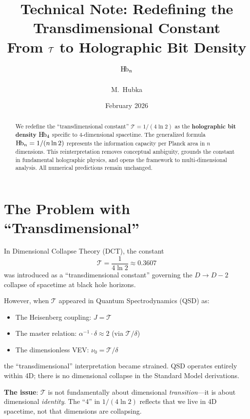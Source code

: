 \documentclass[11pt,a4paper]{article}
\title{\textbf{Technical Note: Redefining the Transdimensional Constant}\\[0.5em]
\Large From $\Tc$ to Holographic Bit Density $\Hb_n$}
\author{M.\ Hubka}
\date{February 2026}
\newcommand{\Hb}{\textnormal{H\kern-0.12em b}}
\newcommand{\Hbn}{\Hb_n}
\newcommand{\Hbfour}{\Hb_4}
\newcommand{\Tc}{\mathcal{T}}
\newcommand{\dgeo}{\delta}
\begin{document}
\maketitle

\begin{abstract}
We redefine the ``transdimensional constant'' $\Tc = 1/(4\ln 2)$ as the \textbf{holographic bit density} $\Hbfour$ specific to 4-dimensional spacetime. The generalized formula $\Hbn = 1/(n\ln 2)$ represents the information capacity per Planck area in $n$ dimensions. This reinterpretation removes conceptual ambiguity, grounds the constant in fundamental holographic physics, and opens the framework to multi-dimensional analysis. All numerical predictions remain unchanged.
\end{abstract}

\section{The Problem with ``Transdimensional''}
\label{sec:problem}

In Dimensional Collapse Theory (DCT), the constant
\begin{equation}
\Tc = \frac{1}{4\ln 2} \approx 0.3607
\end{equation}
was introduced as a ``transdimensional constant'' governing the $D \to D-2$ collapse of spacetime at black hole horizons.

However, when $\Tc$ appeared in Quantum Spectrodynamics (QSD) as:
\begin{itemize}[nosep]
    \item The Heisenberg coupling: $J = \Tc$
    \item The master relation: $\alpha^{-1} \cdot \dgeo \approx 2$ (via $\Tc/\dgeo$)
    \item The dimensionless VEV: $\nu_0 = \Tc/\dgeo$
\end{itemize}
the ``transdimensional'' interpretation became strained. QSD operates entirely within 4D; there is no dimensional collapse in the Standard Model derivations.

\textbf{The issue}: $\Tc$ is not fundamentally about dimensional \emph{transition}---it is about dimensional \emph{identity}. The ``4'' in $1/(4\ln 2)$ reflects that we live in 4D spacetime, not that dimensions are collapsing.

\end{document}
